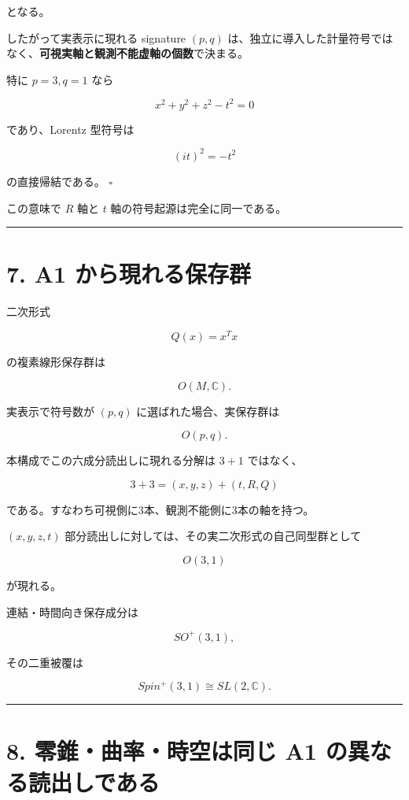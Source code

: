 \documentclass[
  a4paper,
]{ltjsarticle}
\begin{document}
となる。

したがって実表示に現れる signature \((p,q)\)
は、独立に導入した計量符号ではなく、\textbf{可視実軸と観測不能虚軸の個数}で決まる。

特に \(p=3,q=1\) なら

\[
\boxed{
x^2+y^2+z^2-t^2=0
}
\]

であり、Lorentz 型符号は

\[
\boxed{(it)^2=-t^2}
\]

の直接帰結である。 \(\square\)

この意味で \(R\) 軸と \(t\) 軸の符号起源は完全に同一である。

\begin{center}\rule{0.5\linewidth}{0.5pt}\end{center}

\section{7. A1
から現れる保存群}\label{a1-ux304bux3089ux73feux308cux308bux4fddux5b58ux7fa4}

二次形式

\[
Q(x)=x^Tx
\]

の複素線形保存群は

\[
\boxed{
O(M,\mathbb C)
}.
\]

実表示で符号数が \((p,q)\) に選ばれた場合、実保存群は

\[
\boxed{
O(p,q)
}.
\]

本構成でこの六成分読出しに現れる分解は \(3+1\) ではなく、

\[
\boxed{
3+3=(x,y,z)+(t,R,Q)
}
\]

である。すなわち可視側に3本、観測不能側に3本の軸を持つ。

\((x,y,z,t)\) 部分読出しに対しては、その実二次形式の自己同型群として

\[
\boxed{
O(3,1)
}
\]

が現れる。

連結・時間向き保存成分は

\[
SO^+(3,1),
\]

その二重被覆は

\[
\boxed{
Spin^+(3,1)\cong SL(2,\mathbb C)
}.
\]

\begin{center}\rule{0.5\linewidth}{0.5pt}\end{center}

\section{8. 零錐・曲率・時空は同じ A1
の異なる読出しである}\label{ux96f6ux9310ux66f2ux7387ux6642ux7a7aux306fux540cux3058-a1-ux306eux7570ux306aux308bux8aadux51faux3057ux3067ux3042ux308b}
\end{document}
